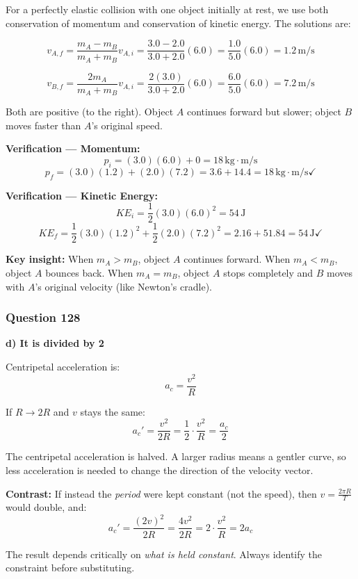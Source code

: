 \documentclass[12pt,letterpaper]{article}
\begin{document}
\begin{explanationbox}
For a perfectly elastic collision with one object initially at rest, we use both conservation of momentum and conservation of kinetic energy. The solutions are:

\[
v_{A,f} = \frac{m_A - m_B}{m_A + m_B}v_{A,i} = \frac{3.0 - 2.0}{3.0 + 2.0}(6.0) = \frac{1.0}{5.0}(6.0) = 1.2\,\text{m/s}
\]

\[
v_{B,f} = \frac{2m_A}{m_A + m_B}v_{A,i} = \frac{2(3.0)}{3.0 + 2.0}(6.0) = \frac{6.0}{5.0}(6.0) = 7.2\,\text{m/s}
\]

Both are positive (to the right). Object $A$ continues forward but slower; object $B$ moves faster than $A$'s original speed.

\textbf{Verification --- Momentum:}
\[
p_i = (3.0)(6.0) + 0 = 18\,\text{kg}\cdot\text{m/s}
\]
\[
p_f = (3.0)(1.2) + (2.0)(7.2) = 3.6 + 14.4 = 18\,\text{kg}\cdot\text{m/s} \checkmark
\]

\textbf{Verification --- Kinetic Energy:}
\[
KE_i = \frac{1}{2}(3.0)(6.0)^2 = 54\,\text{J}
\]
\[
KE_f = \frac{1}{2}(3.0)(1.2)^2 + \frac{1}{2}(2.0)(7.2)^2 = 2.16 + 51.84 = 54\,\text{J} \checkmark
\]

\textbf{Key insight:} When $m_A > m_B$, object $A$ continues forward. When $m_A < m_B$, object $A$ bounces back. When $m_A = m_B$, object $A$ stops completely and $B$ moves with $A$'s original velocity (like Newton's cradle).
\end{explanationbox}

\subsubsection*{Question 128}

\begin{answerbox}
\textbf{d) It is divided by 2}
\end{answerbox}

\begin{explanationbox}
Centripetal acceleration is:
\[
a_c = \frac{v^2}{R}
\]

If $R \to 2R$ and $v$ stays the same:
\[
a_c' = \frac{v^2}{2R} = \frac{1}{2}\cdot\frac{v^2}{R} = \frac{a_c}{2}
\]

The centripetal acceleration is halved. A larger radius means a gentler curve, so less acceleration is needed to change the direction of the velocity vector.

\textbf{Contrast:} If instead the \emph{period} were kept constant (not the speed), then $v = \frac{2\pi R}{T}$ would double, and:
\[
a_c' = \frac{(2v)^2}{2R} = \frac{4v^2}{2R} = 2\cdot\frac{v^2}{R} = 2a_c
\]

The result depends critically on \emph{what is held constant}. Always identify the constraint before substituting.
\end{explanationbox}
\end{document}
